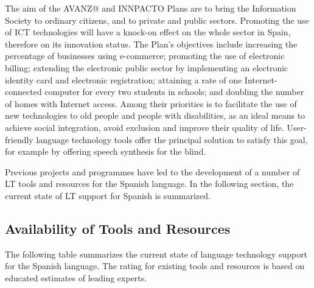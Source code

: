 \begin{multicols}{2}
The aim of the AVANZ@ and INNPACTO Plans are to bring the Information Society to ordinary citizens, and to private and public sectors. Promoting the use of ICT technologies will have a knock-on effect on the whole sector in Spain, therefore on its innovation status. The Plan’s objectives include increasing the percentage of businesses using e-commerce; promoting the use of electronic billing; extending the electronic public sector by implementing an electronic identity card and electronic registration; attaining a rate of one Internet-connected computer for every two students in schools; and doubling the number of homes with Internet access. Among their priorities is to facilitate the use of new technologies to old people and people with disabilities, as an ideal means to achieve social integration, avoid exclusion and improve their quality of life. User-friendly language technology tools offer the principal solution to satisfy this goal, for example by offering speech synthesis for the blind.

Previous projects and programmes have led to the development of a number of LT tools and resources for the Spanish language. In the following section, the current state of LT support for Spanish is summarized.  

\subsection{Availability of Tools and Resources}

The following table summarizes the current state of language technology support for the Spanish language. The rating for existing tools and resources is based on educated estimates of leading experts.


\end{multicols}
